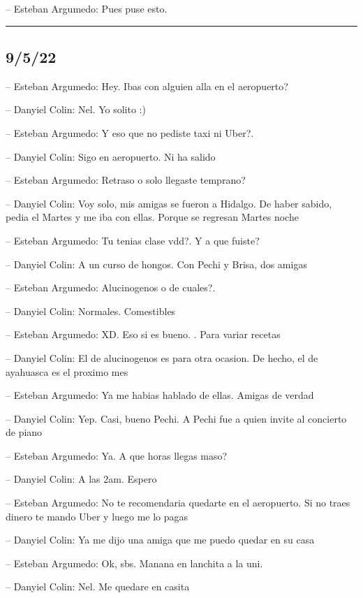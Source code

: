 -- Esteban Argumedo: Pues puse esto.

\begin{center}\rule{0.5\linewidth}{0.5pt}\end{center}

\hypertarget{section-152}{%
\subsection{9/5/22}\label{section-152}}

-- Esteban Argumedo: Hey. Ibas con alguien alla en el aeropuerto?

-- Danyiel Colin: Nel. Yo solito :)

-- Esteban Argumedo: Y eso que no pediste taxi ni Uber?.

-- Danyiel Colin: Sigo en aeropuerto. Ni ha salido

-- Esteban Argumedo: Retraso o solo llegaste temprano?

-- Danyiel Colin: Voy solo, mis amigas se fueron a Hidalgo. De haber
sabido, pedia el Martes y me iba con ellas. Porque se regresan Martes
noche

-- Esteban Argumedo: Tu tenias clase vdd?. Y a que fuiste?

-- Danyiel Colin: A un curso de hongos. Con Pechi y Brisa, dos amigas

-- Esteban Argumedo: Alucinogenos o de cuales?.

-- Danyiel Colin: Normales. Comestibles

-- Esteban Argumedo: XD. Eso si es bueno. . Para variar recetas

-- Danyiel Colin: El de alucinogenos es para otra ocasion. De hecho, el
de ayahuasca es el proximo mes

-- Esteban Argumedo: Ya me habias hablado de ellas. Amigas de verdad

-- Danyiel Colin: Yep. Casi, bueno Pechi. A Pechi fue a quien invite al
concierto de piano

-- Esteban Argumedo: Ya. A que horas llegas maso?

-- Danyiel Colin: A las 2am. Espero

-- Esteban Argumedo: No te recomendaria quedarte en el aeropuerto. Si no
traes dinero te mando Uber y luego me lo pagas

-- Danyiel Colin: Ya me dijo una amiga que me puedo quedar en su casa

-- Esteban Argumedo: Ok, sbs. Manana en lanchita a la uni.

-- Danyiel Colin: Nel. Me quedare en casita

